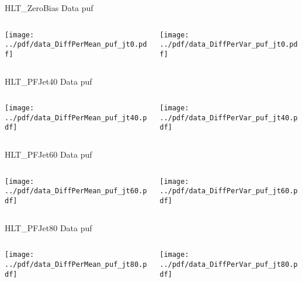 \documentclass[9pt]{beamer}
\begin{document}
\begin{frame}[t]{HLT\_ZeroBias Data puf}
\begin{columns}[T]
  \begin{column}{.5\textwidth}
  \texttt{[image: ../pdf/data\_DiffPerMean\_puf\_jt0.pdf]}
  \end{column}
  \begin{column}{.5\textwidth}
  \texttt{[image: ../pdf/data\_DiffPerVar\_puf\_jt0.pdf]}
  \end{column}
\end{columns}
\end{frame}

\begin{frame}[t]{HLT\_PFJet40 Data puf}
\begin{columns}[T]
  \begin{column}{.5\textwidth}
  \texttt{[image: ../pdf/data\_DiffPerMean\_puf\_jt40.pdf]}
  \end{column}
  \begin{column}{.5\textwidth}
  \texttt{[image: ../pdf/data\_DiffPerVar\_puf\_jt40.pdf]}
  \end{column}
\end{columns}
\end{frame}

\begin{frame}[t]{HLT\_PFJet60 Data puf}
\begin{columns}[T]
  \begin{column}{.5\textwidth}
  \texttt{[image: ../pdf/data\_DiffPerMean\_puf\_jt60.pdf]}
  \end{column}
  \begin{column}{.5\textwidth}
  \texttt{[image: ../pdf/data\_DiffPerVar\_puf\_jt60.pdf]}
  \end{column}
\end{columns}
\end{frame}

\begin{frame}[t]{HLT\_PFJet80 Data puf}
\begin{columns}[T]
  \begin{column}{.5\textwidth}
  \texttt{[image: ../pdf/data\_DiffPerMean\_puf\_jt80.pdf]}
  \end{column}
  \begin{column}{.5\textwidth}
  \texttt{[image: ../pdf/data\_DiffPerVar\_puf\_jt80.pdf]}
  \end{column}
\end{columns}
\end{frame}
\end{document}
